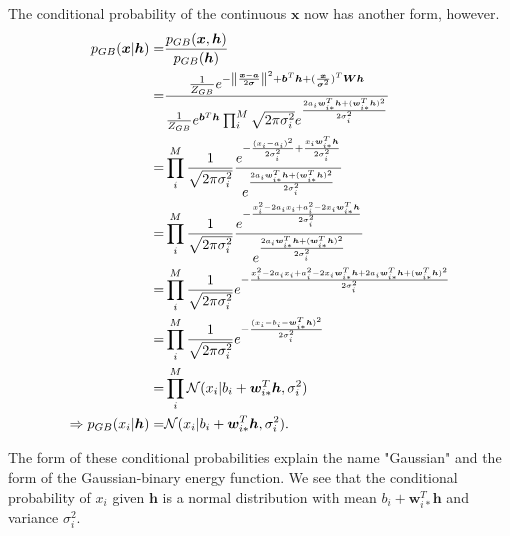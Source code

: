 \documentclass[twoside,english]{uiofysmaster}
\DeclarePairedDelimiter{\norm}{\lVert}{\rVert}
\begin{document}
The conditional probability of the continuous $\bm{x}$ now has another form, however.
\begin{align}
	p_{GB} (\bm{x}|\bm{h})
	=& \frac{p_{GB} (\bm{x}, \bm{h})}{p_{GB} (\bm{h})} \nonumber \\
	=& \frac{\frac{1}{Z_{GB}} e^{-\norm*{\frac{\bm{x} -\bm{a}}{2\bm{\sigma}}}^2 + \bm{b}^T \bm{h} 
	+ (\frac{\bm{x}}{\bm{\sigma}^2})^T \bm{W}\bm{h}}}
	{\frac{1}{Z_{GB}} e^{\bm{b}^T \bm{h}} \prod_i^M
	\sqrt{2\pi \sigma_i^2}
	e^{\frac{2a_i \bm{w}_{i\ast}^T \bm{h} +(\bm{w}_{i\ast}^T \bm{h})^2 }{2\sigma_i^2}}}
	\nonumber \\
	=& \prod_i^M \frac{1}{\sqrt{2\pi \sigma_i^2}}
	\frac{e^{- \frac{(x_i - a_i)^2}{2\sigma_i^2} + \frac{x_i \bm{w}_{i\ast}^T \bm{h}}{2\sigma_i^2} }}
	{e^{\frac{2a_i \bm{w}_{i\ast}^T \bm{h} +(\bm{w}_{i\ast}^T \bm{h})^2 }{2\sigma_i^2}}}
	\nonumber \\
	=& \prod_i^M \frac{1}{\sqrt{2\pi \sigma_i^2}}
	\frac{e^{-\frac{x_i^2 - 2a_i x_i + a_i^2 - 2x_i \bm{w}_{i\ast}^T\bm{h} }{2\sigma_i^2} } }
	{e^{\frac{2a_i \bm{w}_{i\ast}^T \bm{h} +(\bm{w}_{i\ast}^T \bm{h})^2 }{2\sigma_i^2}}}
	\nonumber \\
	=& \prod_i^M \frac{1}{\sqrt{2\pi \sigma_i^2}}
	e^{- \frac{x_i^2 - 2a_i x_i + a_i^2 - 2x_i \bm{w}_{i\ast}^T\bm{h}
	+ 2a_i \bm{w}_{i\ast}^T \bm{h} +(\bm{w}_{i\ast}^T \bm{h})^2}
	{2\sigma_i^2} }
	\nonumber \\
	=& \prod_i^M \frac{1}{\sqrt{2\pi \sigma_i^2}}
	e^{ - \frac{(x_i - b_i - \bm{w}_{i\ast}^T \bm{h})^2}{2\sigma_i^2}} \nonumber \\
	=& \prod_i^M \mathcal{N}
	(x_i | b_i + \bm{w}_{i\ast}^T \bm{h}, \sigma_i^2) \\
	\Rightarrow p_{GB} (x_i|\bm{h}) =& \mathcal{N}
	(x_i | b_i + \bm{w}_{i\ast}^T \bm{h}, \sigma_i^2) .
\end{align}

The form of these conditional probabilities explain the name "Gaussian" and the form of the Gaussian-binary energy function. We see that the conditional probability of $x_i$ given $\bm{h}$ is a normal distribution with mean $b_i + \bm{w}_{i\ast}^T \bm{h}$ and variance $\sigma_i^2$.
\end{document}
